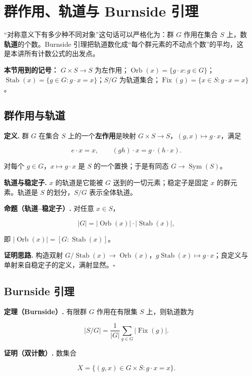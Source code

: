 \section{群作用、轨道与 Burnside 引理}


“对称意义下有多少种不同对象”这句话可以严格化为：群 $G$ 作用在集合 $S$ 上，数\textbf{轨道}的个数。Burnside 引理把轨道数化成“每个群元素的不动点个数”的平均，这是本讲所有计数公式的出发点。

\textbf{本节用到的记号：} $G\times S\to S$ 为左作用；$\operatorname{Orb}(x)=\{g\cdot x:g\in G\}$；$\operatorname{Stab}(x)=\{g\in G:g\cdot x=x\}$；$S/G$ 为轨道集合；$\operatorname{Fix}(g)=\{x\in S:g\cdot x=x\}$。

\subsection{群作用与轨道}


\textbf{定义.} 群 $G$ 在集合 $S$ 上的一个\textbf{左作用}是映射 $G\times S\to S$，$(g,x)\mapsto g\cdot x$，满足

\[
e\cdot x=x,\qquad (gh)\cdot x=g\cdot(h\cdot x).
\]

对每个 $g\in G$，$x\mapsto g\cdot x$ 是 $S$ 的一个置换；于是有同态 $G\to\operatorname{Sym}(S)$。

\textbf{轨道与稳定子.} $x$ 的轨道是它能被 $G$ 送到的一切元素；稳定子是固定 $x$ 的群元素。轨道是 $S$ 的划分，$S/G$ 表示全体轨道。

\textbf{命题（轨道--稳定子）.} 对任意 $x\in S$，

\[
|G|=|\operatorname{Orb}(x)|\cdot|\operatorname{Stab}(x)|,
\]

即 $|\operatorname{Orb}(x)|=[G:\operatorname{Stab}(x)]$。

\textbf{证明思路.} 构造双射 $G/\operatorname{Stab}(x)\to\operatorname{Orb}(x)$，$g\operatorname{Stab}(x)\mapsto g\cdot x$；良定义与单射来自稳定子的定义，满射显然。$\square$

\subsection{Burnside 引理}


\textbf{定理（Burnside）.} 有限群 $G$ 作用在有限集 $S$ 上，则轨道数为

\[
|S/G|=\frac{1}{|G|}\sum_{g\in G}|\operatorname{Fix}(g)|.
\]

\textbf{证明（双计数）.} 数集合

\[
X=\{(g,x)\in G\times S:g\cdot x=x\}.
\]

